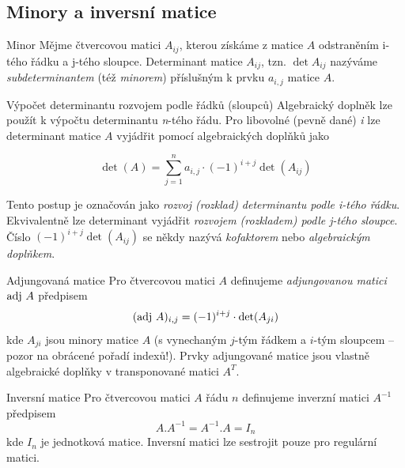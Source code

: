 \subsection{Minory a inversní matice}

\begin{definiceN}{Minor}
Mějme čtvercovou matici $A_{ij}$, kterou získáme z matice $A$ odstraněním i-tého řádku a j-tého sloupce. Determinant matice $A_{ij}$, tzn. $\det A_{ij}$ nazýváme \emph{subdeterminantem} (též \emph{minorem}) příslušným k prvku $a_{i,j}$ matice $A$.
\end{definiceN}

\begin{obecne}{Výpočet determinantu rozvojem podle řádků (sloupců)}
Algebraický doplněk lze použít k výpočtu determinantu \emph{n}-tého řádu. Pro libovolné (pevně dané) \emph{i} lze determinant matice $A$ vyjádřit pomocí algebraických doplňků jako

$$\det( A ) = \sum_{j=1}^n a_{i,j}\cdot (-1)^{i+j}\det( A_{ij} )$$

Tento postup je označován jako \emph{rozvoj (rozklad) determinantu podle i-tého řádku}. Ekvivalentně lze determinant vyjádřit \emph{rozvojem (rozkladem) podle j-tého sloupce}. Číslo $(-1)^{i+j}\det( A_{ij} )$ se někdy nazývá \emph{kofaktorem} nebo \emph{algebraickým doplňkem}.
\end{obecne}

\begin{definiceN}{Adjungovaná matice}
Pro čtvercovou matici $A$ definujeme \emph{adjungovanou matici} $\mathrm{adj\ } A$ předpisem
$$(\mathrm{adj\ } A)_{i,j}=(-1)^{i+j}\cdot\det(A_{ji})$$
kde $A_{ji}$ jsou minory matice $A$ (s vynechaným $j$-tým řádkem a $i$-tým sloupcem -- pozor na obrácené pořadí indexů!). Prvky adjungované matice jsou vlastně algebraické doplňky v transponované matici $A^T$.
\end{definiceN}

\begin{definiceN}{Inversní matice}
Pro čtvercovou matici $A$ řádu $n$ definujeme inverzní matici $A^{-1}$ předpisem
$$A.A^{-1} = A^{-1}.A = I_n$$
kde $I_n$ je jednotková matice. Inversní matici lze sestrojit pouze pro regulární matici.
\end{definiceN}

